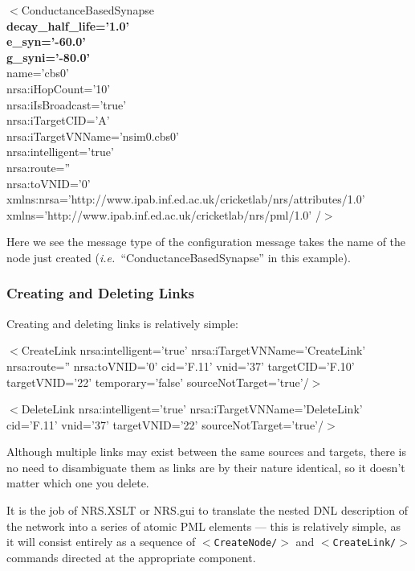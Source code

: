 \documentclass[pdftex,a4paper]{article}
\newcommand{\ie}{{\em i.e.\ }}
\newcommand{\XML}[2][]{{\tt \small $<$#2#1/$>$}}
\newcommand{\XMLtext}[1]{
  \begin{tt}
    \begin{small}
      \begin{list}{}{
          \setlength{\topsep}{0pt}
          \setlength{\partopsep}{0pt}
          \setlength{\itemsep}{0pt}
          \setlength{\parsep}{0pt}
          \setlength{\leftmargin}{2em}
          \setlength{\rightmargin}{2em}
          \setlength{\labelsep}{0pt}
        }
      \item #1
      \end{list}
    \end{small}
  \end{tt}
}
\newcommand{\XMLsimple}[2][]{\XMLtext{$<$#2#1/$>$}}
\begin{document}
\XMLsimple[\\
\textbf{decay\_half\_life='1.0'}\\
\textbf{e\_syn='-60.0'}\\
\textbf{g\_syni='-80.0'}\\
name='cbs0'\\
nrsa:iHopCount='10'\\
nrsa:iIsBroadcast='true'\\
nrsa:iTargetCID='A'\\
nrsa:iTargetVNName='nsim0.cbs0'\\
nrsa:intelligent='true'\\
nrsa:route=''\\
nrsa:toVNID='0'\\
xmlns:nrsa='http://www.ipab.inf.ed.ac.uk/cricketlab/nrs/attributes/1.0'\\
xmlns='http://www.ipab.inf.ed.ac.uk/cricketlab/nrs/pml/1.0'
]{ConductanceBasedSynapse}

Here we see the message type of the configuration message takes the name
of the node just created (\ie ``ConductanceBasedSynapse'' in this
example).

\subsubsection{Creating and Deleting Links}

Creating and deleting links is relatively simple:

\XMLsimple[ nrsa:intelligent='true' nrsa:iTargetVNName='CreateLink'
  nrsa:route='' nrsa:toVNID='0' cid='F.11'
  vnid='37' %
  targetCID='F.10' targetVNID='22' %
  temporary='false' sourceNotTarget='true']{CreateLink}

\XMLsimple[ nrsa:intelligent='true' nrsa:iTargetVNName='DeleteLink'
  cid='F.11' vnid='37' %
  targetVNID='22' %
  sourceNotTarget='true']{DeleteLink}

Although multiple links may exist between the same sources and
targets, there is no need to disambiguate them as links are by their
nature identical, so it doesn't matter which one you delete.

It is the job of NRS.XSLT or NRS.gui to translate the nested DNL
description of the network into a series of atomic PML elements ---
this is relatively simple, as it will consist entirely as a sequence
of \XML{CreateNode} and \XML{CreateLink} commands directed at the
appropriate component.
\end{document}
